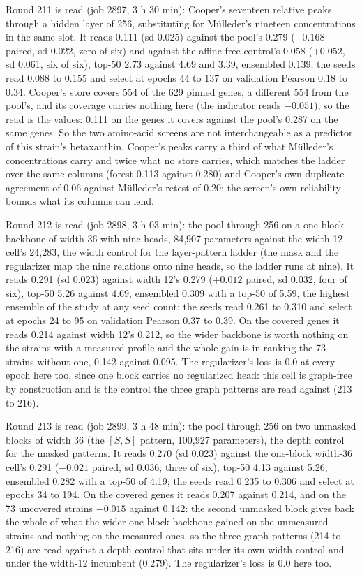 Round 211 is read (job 2897, 3 h 30 min): Cooper's seventeen relative peaks through a
hidden layer of 256, substituting for M\"ulleder's nineteen concentrations in the same
slot. It reads 0.111 (sd 0.025) against the pool's 0.279 ($-0.168$ paired, sd 0.022,
zero of six) and against the affine-free control's 0.058 ($+0.052$, sd 0.061, six of
six), top-50 2.73 against 4.69 and 3.39, ensembled 0.139; the seeds read 0.088 to 0.155
and select at epochs 44 to 137 on validation Pearson 0.18 to 0.34. Cooper's store covers
554 of the 629 pinned genes, a different 554 from the pool's, and its coverage carries
nothing here (the indicator reads $-0.051$), so the read is the values: 0.111 on the
genes it covers against the pool's 0.287 on the same genes. So the two amino-acid
screens are not interchangeable as a predictor of this strain's betaxanthin. Cooper's
peaks carry a third of what M\"ulleder's concentrations carry and twice what no store
carries, which matches the ladder over the same columns (forest 0.113 against 0.280) and
Cooper's own duplicate agreement of 0.06 against M\"ulleder's retest of 0.20: the
screen's own reliability bounds what its columns can lend.

Round 212 is read (job 2898, 3 h 03 min): the pool through 256 on a one-block backbone
of width 36 with nine heads, 84,907 parameters against the width-12 cell's 24,283, the
width control for the layer-pattern ladder (the mask and the regularizer map the nine
relations onto nine heads, so the ladder runs at nine). It reads 0.291 (sd 0.023)
against width 12's 0.279 ($+0.012$ paired, sd 0.032, four of six), top-50 5.26 against
4.69, ensembled 0.309 with a top-50 of 5.59, the highest ensemble of the study at any
seed count; the seeds read 0.261 to 0.310 and select at epochs 24 to 95 on validation
Pearson 0.37 to 0.39. On the covered genes it reads 0.214 against width 12's 0.212, so
the wider backbone is worth nothing on the strains with a measured profile and the whole
gain is in ranking the 73 strains without one, 0.142 against 0.095. The regularizer's
loss is 0.0 at every epoch here too, since one block carries no regularized head: this
cell is graph-free by construction and is the control the three graph patterns are read
against (213 to 216).

Round 213 is read (job 2899, 3 h 48 min): the pool through 256 on two unmasked blocks
of width 36 (the $[S, S]$ pattern, 100,927 parameters), the depth control for the
masked patterns. It reads 0.270 (sd 0.023) against the one-block width-36 cell's 0.291
($-0.021$ paired, sd 0.036, three of six), top-50 4.13 against 5.26, ensembled 0.282
with a top-50 of 4.19; the seeds read 0.235 to 0.306 and select at epochs 34 to 194.
On the covered genes it reads 0.207 against 0.214, and on the 73 uncovered strains
$-0.015$ against 0.142: the second unmasked block gives back the whole of what the
wider one-block backbone gained on the unmeasured strains and nothing on the measured
ones, so the three graph patterns (214 to 216) are read against a depth control that
sits under its own width control and under the width-12 incumbent (0.279). The
regularizer's loss is 0.0 here too.

